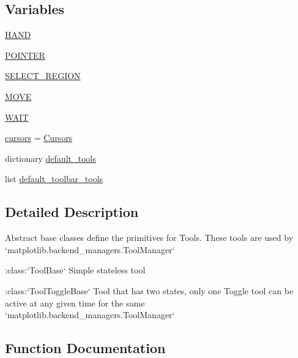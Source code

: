 \subsection*{Variables}
\begin{DoxyCompactItemize}
\item 
\hyperlink{namespacematplotlib_1_1backend__tools_a32dd4f4cca63a64acc998bbbe9cf5e5d}{H\+A\+ND}
\item 
\hyperlink{namespacematplotlib_1_1backend__tools_a90603cf05838f8ca1d0951b8438ffa9b}{P\+O\+I\+N\+T\+ER}
\item 
\hyperlink{namespacematplotlib_1_1backend__tools_af3d3f9cd6befc6b24d422f729dbd3adc}{S\+E\+L\+E\+C\+T\+\_\+\+R\+E\+G\+I\+ON}
\item 
\hyperlink{namespacematplotlib_1_1backend__tools_a4925327100b66fee5fad967a4a6da993}{M\+O\+VE}
\item 
\hyperlink{namespacematplotlib_1_1backend__tools_ab019e203dab94810114d4c22e5deaeba}{W\+A\+IT}
\item 
\hyperlink{namespacematplotlib_1_1backend__tools_afe7a282d1d22c4ce85719f8e79f20f86}{cursors} = \hyperlink{classmatplotlib_1_1backend__tools_1_1Cursors}{Cursors}
\item 
dictionary \hyperlink{namespacematplotlib_1_1backend__tools_a8e5bd024d90b17a4841e51893bb2f2c8}{default\+\_\+tools}
\item 
list \hyperlink{namespacematplotlib_1_1backend__tools_a5a62cc4cdc0d0dce97359b3133ef5113}{default\+\_\+toolbar\+\_\+tools}
\end{DoxyCompactItemize}


\subsection{Detailed Description}
\begin{DoxyVerb}Abstract base classes define the primitives for Tools.
These tools are used by `matplotlib.backend_managers.ToolManager`

:class:`ToolBase`
    Simple stateless tool

:class:`ToolToggleBase`
    Tool that has two states, only one Toggle tool can be
    active at any given time for the same
    `matplotlib.backend_managers.ToolManager`
\end{DoxyVerb}
 

\subsection{Function Documentation}
\mbox{\label{namespacematplotlib_1_1backend__tools_a2179ca0a4641d1282f3076d4782f18eb}} 
